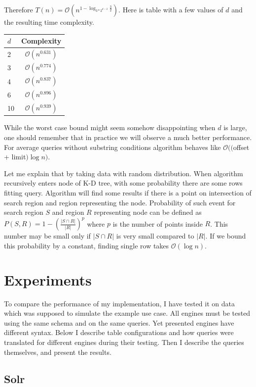 \documentclass[10pt,a4paper]{article}
\newcommand{\Oh}{\mathcal{O}}
\begin{document}
Therefore $T(n) = \Oh(n^{1 - \log_{3*2^{d-2}}{\frac{3}{2}}})$.
Here is table with a few values of $d$ and the resulting time complexity.

\begin{center}
\begin{tabular}{|l|c|}
\hline $d$ & Complexity \\
\hline 2 & $\Oh(n^{0.631})$ \\
\hline 3 & $\Oh(n^{0.774})$  \\
\hline 4 & $\Oh(n^{0.837})$ \\
\hline 6 & $\Oh(n^{0.896})$ \\
\hline 10 & $\Oh(n^{0.939})$ \\
\hline 
\end{tabular}
\end{center}

While the worst case bound might seem somehow disappointing when $d$ is large, one should remember that in practice we will observe a much better performance. For average queries without substring conditions algorithm behaves like $\Oh(($offset + limit$) \log n)$.

Let me explain that by taking data with random distribution. When algorithm recursively enters node of K-D tree, with some probability there are some rows fitting query. Algorithm will find some results if there is a point on intersection of search region and region representing the node. Probability of such event for search region $S$ and region $R$ representing node can be defined as $P(S, R) = 1 - (\frac{|S \cap R|}{|R|})^p$ where $p$ is the number of points inside $R$. This number may be small only if $|S \cap R|$ is very small compared to $|R|$. If we bound this probability by a constant, finding single row takes $\Oh(\log n)$.

\section{Experiments}
\label{chapter:tests}

To compare the performance of my implementation, I have tested it on data which was supposed to simulate the example use case. All engines must be tested using the same schema and on the same queries. Yet presented engines have different syntax. Below I describe table configurations and how queries were translated for different engines during their testing. Then I describe the queries themselves, and present the results.

\subsection{Solr}
\end{document}
